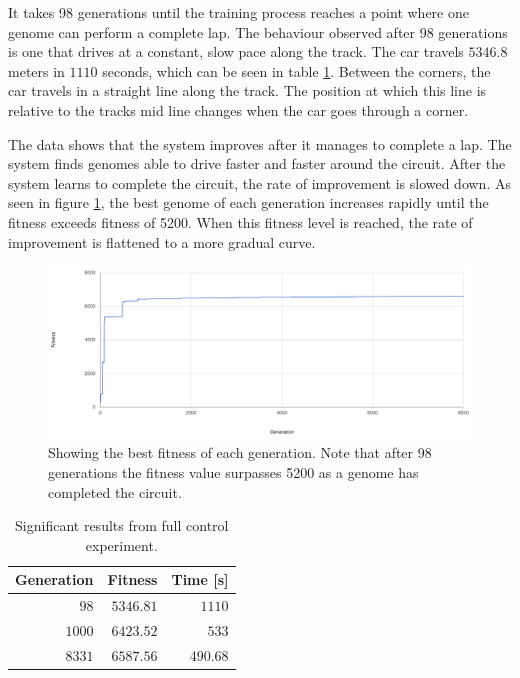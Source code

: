 It takes 98 generations until the training process reaches a point where one genome can perform a complete lap. The behaviour observed after 98 generations is one that drives at a constant, slow pace along the track. The car travels $5346.8$ meters in $1110$ seconds, which can be seen in table \ref{tab:fullcontrol}. Between the corners, the car travels in a straight line along the track. The position at which this line is relative to the tracks mid line changes when the car goes through a corner.

The data shows that the system improves after it manages to complete a lap. The system finds genomes able to drive faster and faster around the circuit. After the system learns to complete the circuit, the rate of improvement is slowed down. As seen in figure \ref{fig:steerspeeddata}, the best genome of each generation increases rapidly until the fitness exceeds fitness of 5200. When this fitness level is reached, the rate of improvement is flattened to a more gradual curve. 

\begin{figure}[h]
\includegraphics[width=\textwidth]{report/images/graphs/steeringandspeedcontrolrun1}
\centering
\caption{Showing the best fitness of each generation. Note that after 98 generations the fitness value surpasses 5200 as a genome has completed the circuit.}
\label{fig:steerspeeddata}
\end{figure}

\begin{table}[h!] 
  \centering
  \begin{tabular}{rrr}
    \toprule
    Generation & Fitness & Time [s]\\
    \midrule
    $98$ & $5346.81$ & $1110$ \\
    $1000$ & $6423.52$ & $533$ \\
    $8331$ & $6587.56$ & $490.68$  \\
    \bottomrule
  \end{tabular}
  \caption{Significant results from full control experiment.}
  \label{tab:fullcontrol}
\end{table}

